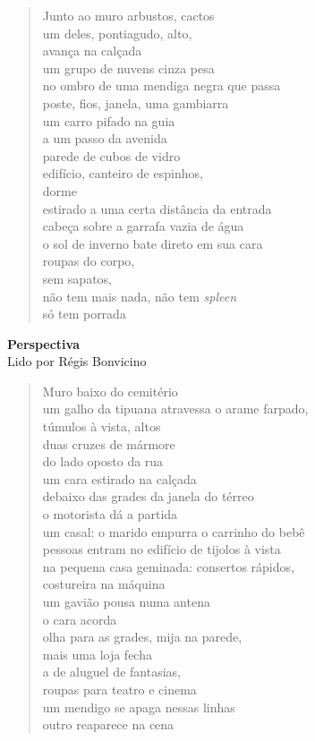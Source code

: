 \begin{verse}
Junto ao muro arbustos, cactos\\
um deles, pontiagudo, alto,\\
avança na calçada\\
um grupo de nuvens cinza pesa\\
no ombro de uma mendiga negra que passa\\
poste, fios, janela, uma gambiarra\\
um carro pifado na guia\\
a um passo da avenida\\
parede de cubos de vidro\\
edifício, canteiro de espinhos,\\
dorme\\
estirado a uma certa distância da entrada\\
cabeça sobre a garrafa vazia de água\\
o sol de inverno bate direto em sua cara\\
roupas do corpo,\\
sem sapatos,\\
não tem mais nada, não tem \emph{spleen}\\
só tem porrada
\end{verse}

\pagebreak

\textbf{Perspectiva}\\
Lido por Régis Bonvicino

\begin{verse}
Muro baixo do cemitério\\
um galho da tipuana atravessa o arame farpado,\\
túmulos à vista, altos\\
duas cruzes de mármore\\[5pt]
do lado oposto da rua\\
um cara estirado na calçada\\
debaixo das grades da janela do térreo\\
o motorista dá a partida\\[5pt]
um casal: o marido empurra o carrinho do bebê\\
pessoas entram no edifício de tijolos à vista\\
na pequena casa geminada: consertos rápidos,\\
costureira na máquina\\[5pt]
um gavião pousa numa antena\\
o cara acorda\\
olha para as grades, mija na parede,\\
mais uma loja fecha\\[5pt]
a de aluguel de fantasias,\\
roupas para teatro e cinema\\
um mendigo se apaga nessas linhas\\
outro reaparece na cena
\end{verse}

